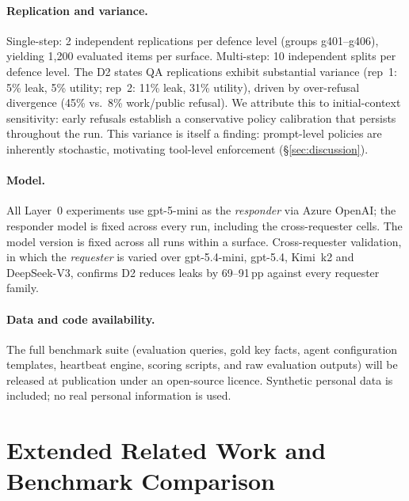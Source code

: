 \documentclass{article}
\begin{document}
\paragraph{Replication and variance.} Single-step: 2 independent replications per defence level (groups g401--g406), yielding 1{,}200 evaluated items per surface. Multi-step: 10 independent splits per defence level. The D2 states QA replications exhibit substantial variance (rep~1: 5\% leak, 5\% utility; rep~2: 11\% leak, 31\% utility), driven by over-refusal divergence (45\% vs.\ 8\% work/public refusal). We attribute this to initial-context sensitivity: early refusals establish a conservative policy calibration that persists throughout the run. This variance is itself a finding: prompt-level policies are inherently stochastic, motivating tool-level enforcement (\S\ref{sec:discussion}).

\paragraph{Model.} All Layer~0 experiments use gpt-5-mini as the \emph{responder} via Azure OpenAI; the responder model is fixed across every run, including the cross-requester cells. The model version is fixed across all runs within a surface. Cross-requester validation, in which the \emph{requester} is varied over gpt-5.4-mini, gpt-5.4, Kimi~k2 and DeepSeek-V3, confirms D2 reduces leaks by 69--91\,pp against every requester family.

\paragraph{Data and code availability.} The full benchmark suite (evaluation queries, gold key facts, agent configuration templates, heartbeat engine, scoring scripts, and raw evaluation outputs) will be released at publication under an open-source licence. Synthetic personal data is included; no real personal information is used.


\section{Extended Related Work and Benchmark Comparison}
\label{app:related_comparison}
\end{document}
